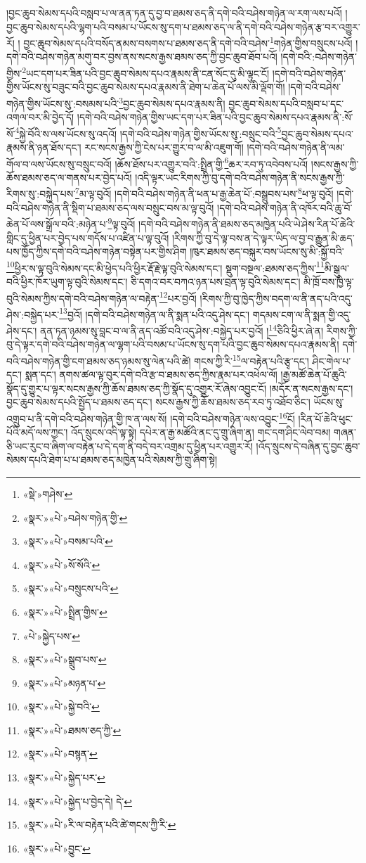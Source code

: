 །བྱང་ཆུབ་སེམས་དཔའི་བསླབ་པ་ལ་ནན་ཏན་དུ་བྱ་བ་ཐམས་ཅད་ནི་དགེ་བའི་བཤེས་གཉེན་ལ་རག་ལས་པའོ། །བྱང་ཆུབ་སེམས་དཔའི་ལྷག་པའི་བསམ་པ་ཡོངས་སུ་དག་པ་ཐམས་ཅད་ལ་ནི་དགེ་བའི་བཤེས་གཉེན་རྩ་བར་འགྱུར་རོ། །
བྱང་ཆུབ་སེམས་དཔའི་བསོད་ནམས་བསགས་པ་ཐམས་ཅད་ནི་དགེ་བའི་བཤེས་\footnote{«སྡེ་»གཤེས་}གཉེན་གྱིས་བསྲུངས་པའོ། །དགེ་བའི་བཤེས་གཉེན་མགུ་བར་བྱས་ནས་སངས་རྒྱས་ཐམས་ཅད་ཀྱི་བྱང་ཆུབ་ཐོབ་པའོ། །དགེ་བའི་:བཤེས་གཉེན་གྱིས་\footnote{«སྣར་»«པེ་»བཤེས་གཉེན་གྱི་}ཡང་དག་པར་ཟིན་པའི་བྱང་ཆུབ་སེམས་དཔའ་རྣམས་ནི་ངན་སོང་དུ་མི་ལྟུང་ངོ། །དགེ་བའི་བཤེས་གཉེན་གྱིས་ཡོངས་སུ་བཟུང་བའི་བྱང་ཆུབ་སེམས་དཔའ་རྣམས་ནི་ཐེག་པ་ཆེན་པོ་ལས་མི་ལྡོག་གོ། །དགེ་བའི་བཤེས་གཉེན་གྱིས་ཡོངས་སུ་:བསམས་པའི་\footnote{«སྣར་»«པེ་»བསམ་པའི་}བྱང་ཆུབ་སེམས་དཔའ་རྣམས་ནི། བྱང་ཆུབ་སེམས་དཔའི་བསླབ་པ་དང་འགལ་བར་མི་བྱེད་དོ། །དགེ་བའི་བཤེས་གཉེན་གྱིས་ཡང་དག་པར་ཟིན་པའི་བྱང་ཆུབ་སེམས་དཔའ་རྣམས་ནི་:སོ་སོ་\footnote{«སྣར་»«པེ་»སོ་སོའི་}སྐྱེ་བོའི་ས་ལས་ཡོངས་སུ་འདའོ། །དགེ་བའི་བཤེས་གཉེན་གྱིས་ཡོངས་སུ་:བསྲུང་བའི་\footnote{«སྣར་»«པེ་»བསྲུངས་པའི་}བྱང་ཆུབ་སེམས་དཔའ་རྣམས་ནི་ཉན་ཐོས་དང་། རང་སངས་རྒྱས་ཀྱི་ངེས་པར་གྱུར་བ་ལ་མི་འཇུག་གོ། །དགེ་བའི་བཤེས་གཉེན་ནི་ལམ་གོལ་བ་ལས་ཡོངས་སུ་བསྲུང་བའོ། །ཆོས་ཐོས་པར་འགྱུར་བའི་:སྤྲིན་གྱི་\footnote{«སྣར་»«པེ་»སྤྲིན་གྱིས་}ཆར་རབ་ཏུ་འབེབས་པའོ། །སངས་རྒྱས་ཀྱི་ཆོས་ཐམས་ཅད་ལ་གནས་པར་བྱེད་པའོ། །འདི་ལྟར་ཡང་རིགས་ཀྱི་བུ་དགེ་བའི་བཤེས་གཉེན་ནི་སངས་རྒྱས་ཀྱི་རིགས་སུ་:བསྐྱེད་པས་\footnote{«པེ་»སྐྱེད་པས་}མ་ལྟ་བུའོ། །དགེ་བའི་བཤེས་གཉེན་ནི་ཕན་པ་རྒྱ་ཆེན་པོ་:བསྒྲུབས་པས་\footnote{«སྣར་»«པེ་»སྒྲུབ་པས་}ཕ་ལྟ་བུའོ། །དགེ་བའི་བཤེས་གཉེན་ནི་སྡིག་པ་ཐམས་ཅད་ལས་བསྲུང་བས་མ་ལྟ་བུའོ། །དགེ་བའི་བཤེས་གཉེན་ནི་འཁོར་བའི་ཆུ་བོ་ཆེན་པོ་ལས་སྒྲོལ་བའི་:མཉེན་པ་\footnote{«སྣར་»«པེ་»མཉན་པ་}ལྟ་བུའོ། །དགེ་བའི་བཤེས་གཉེན་ནི་ཐམས་ཅད་མཁྱེན་པའི་ཡེ་ཤེས་རིན་པོ་ཆེའི་གླིང་དུ་ཕྱིན་པར་བྱེད་པས་གདོས་པ་འཛིན་པ་ལྟ་བུའོ། །རིགས་ཀྱི་བུ་དེ་ལྟ་བས་ན་དེ་ལྟར་ཡིད་ལ་བྱ་བ་རྒྱུན་མི་ཆད་པས་ཁྱོད་ཀྱིས་དགེ་བའི་བཤེས་གཉེན་བསྟེན་པར་གྱིས་ཤིག །ཁུར་ཐམས་ཅད་བསྐུར་བས་ཡོངས་སུ་མི་:སྐྱོ་བའི་\footnote{«སྣར་»«པེ་»སྐྱེ་བའི་}ཕྱིར་ས་ལྟ་བུའི་སེམས་དང་མི་ཕྱེད་པའི་ཕྱིར་རྡོ་རྗེ་ལྟ་བུའི་སེམས་དང་། སྡུག་བསྔལ་:ཐམས་ཅད་ཀྱིས་\footnote{«སྣར་»«པེ་»ཐམས་ཅད་ཀྱི་}མི་སྒུལ་བའི་ཕྱིར་ཁོར་ཡུག་ལྟ་བུའི་སེམས་དང་། ཅི་དགའ་བར་བཀའ་ཉན་པས་བྲན་ལྟ་བུའི་སེམས་དང་། མི་ཁྲོ་བས་ཁྱི་ལྟ་བུའི་སེམས་ཀྱིས་དགེ་བའི་བཤེས་གཉེན་ལ་བརྟེན་\footnote{«སྣར་»«པེ་»བསྙན་}པར་བྱའོ། །རིགས་ཀྱི་བུ་ཁྱེད་ཀྱིས་བདག་ལ་ནི་ནད་པའི་འདུ་ཤེས་:བསྐྱེད་པར་\footnote{«སྣར་»«པེ་»སྐྱེད་པར་}བྱའོ། །དགེ་བའི་བཤེས་གཉེན་ལ་ནི་སྨན་པའི་འདུ་ཤེས་དང་། གདམས་ངག་ལ་ནི་སྨན་གྱི་འདུ་ཤེས་དང་། ནན་ཏན་ཉམས་སུ་བླང་བ་ལ་ནི་ནད་འཚོ་བའི་འདུ་ཤེས་:བསྐྱེད་པར་བྱའོ། །\footnote{«སྣར་»«པེ་»སྐྱེད་པ་བྱེད་དེ། དེ་}ཅིའི་ཕྱིར་ཞེ་ན། རིགས་ཀྱི་བུ་དེ་ལྟར་དགེ་བའི་བཤེས་གཉེན་ལ་ལྷག་པའི་བསམ་པ་ཡོངས་སུ་དག་པའི་བྱང་ཆུབ་སེམས་དཔའ་རྣམས་ནི། དགེ་བའི་བཤེས་གཉེན་གྱི་ངག་ཐམས་ཅད་ཉམས་སུ་ལེན་པའི་ཚེ། གངས་ཀྱི་རི་\footnote{«སྣར་»«པེ་»རི་ལ་བརྟེན་པའི་ཚེ་གངས་ཀྱི་རི་}ལ་བརྟེན་པའི་རྩྭ་དང་། ཤིང་གེལ་པ་དང་། སྨན་དང་། ནགས་ཚལ་ལྟ་བུར་དགེ་བའི་རྩ་བ་ཐམས་ཅད་ཀྱིས་རྣམ་པར་འཕེལ་ལོ། །རྒྱ་མཚོ་ཆེན་པོ་ཆུའི་སྣོད་དུ་གྱུར་པ་ལྟར་སངས་རྒྱས་ཀྱི་ཆོས་ཐམས་ཅད་ཀྱི་སྣོད་དུ་འགྱུར་རོ་ཞེས་འབྱུང་ངོ། །མདོར་ན་སངས་རྒྱས་དང་། བྱང་ཆུབ་སེམས་དཔའི་སྤྱོད་པ་ཐམས་ཅད་དང་། སངས་རྒྱས་ཀྱི་ཆོས་ཐམས་ཅད་རབ་ཏུ་འཐོབ་ཅིང་། ཡོངས་སུ་འགྲུབ་པ་ནི་དགེ་བའི་བཤེས་གཉེན་གྱི་ཁ་ན་ལས་སོ། །དགེ་བའི་བཤེས་གཉེན་ལས་འབྱུང་\footnote{«སྣར་»«པེ་»བྱུང་}ངོ། །རིན་པོ་ཆེའི་ཕུང་པོའི་མདོ་ལས་ཀྱང་། འོད་སྲུངས་འདི་ལྟ་སྟེ། དཔེར་ན་རྒྱ་མཚོའི་ནང་དུ་གྲུ་ཞིག་ན། གང་དག་ཤིང་ལེབ་བམ། གཞན་ཅི་ཡང་རུང་བ་ཞིག་ལ་བརྟེན་པ་དེ་དག་ནི་བདེ་བར་འགྲམ་དུ་ཕྱིན་པར་འགྱུར་རོ། །འོད་སྲུངས་དེ་བཞིན་དུ་བྱང་ཆུབ་སེམས་དཔའི་ཐེག་པ་པ་ཐམས་ཅད་མཁྱེན་པའི་སེམས་ཀྱི་གྲུ་ཞིག་སྟེ། 